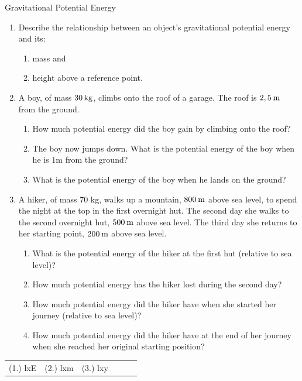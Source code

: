 \begin{exercises}{Gravitational Potential Energy }
            \nopagebreak
\noindent \begin{enumerate}[noitemsep, label=\textbf{\arabic*}. ] 

\item Describe the relationship between an object's gravitational potential energy and its:
\begin{enumerate}[noitemsep, label=\textbf{\alph*}. ] 
\item mass and
\item height above a reference point.
\end{enumerate}

\item A boy, of mass $30\phantom{\rule{2pt}{0ex}}\text{kg}$, climbs onto the roof of a garage. The roof is $2,5\phantom{\rule{2pt}{0ex}}\text{m}$ from the ground. 
\begin{enumerate}[noitemsep, label=\textbf{\alph*}. ] 
\label{m38784*uid54}\item How much potential energy did the boy gain by climbing onto the roof?
\label{m38784*uid55}\item The boy now jumps down. What is the potential energy of the boy when he is $1 \text{m}$ from the ground?
\label{m38784*uid56}\item What is the potential energy of the boy when he lands on the ground?
\end{enumerate}
                \label{m38784*uid57}\item A hiker, of mass 70 kg, walks up a mountain, $800\phantom{\rule{2pt}{0ex}}\text{m}$ above sea level, to spend the night at the top in the first overnight hut. The second day she walks to the second overnight hut, $500\phantom{\rule{2pt}{0ex}}\text{m}$ above sea level. The third day she returns to her starting point, $200\phantom{\rule{2pt}{0ex}}\text{m}$ above sea level.
\label{m38784*id66702}\begin{enumerate}[noitemsep, label=\textbf{\alph*}. ] 
            \label{m38784*uid58}\item What is the potential energy of the hiker at the first hut (relative to sea level)?
\label{m38784*uid59}\item How much potential energy has the hiker lost during the second day?
\label{m38784*uid60}\item How much potential energy did the hiker have when she started her journey (relative to sea level)?
\label{m38784*uid61}\item How much potential energy did the hiker have at the end of her journey when she reached her original starting position?
\end{enumerate}
                \end{enumerate}
  \label{m38784**end}
\par \practiceinfo
 \par \begin{tabular}[h]{cccccc}
 (1.) lxE  &  (2.) lxm  &  (3.) lxy  & \end{tabular}
\end{exercises}


